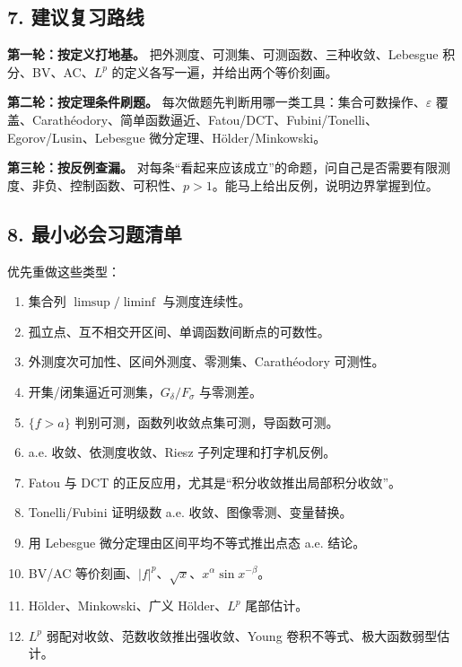\documentclass[
UTF8]{ctexart}
\providecommand{\tightlist}{%
\setlength{\itemsep}{0pt}\setlength{\parskip}{0pt}}
\begin{document}
\subsection{7. 建议复习路线}\label{ux5efaux8baeux590dux4e60ux8defux7ebf}

\textbf{第一轮：按定义打地基。}
把外测度、可测集、可测函数、三种收敛、Lebesgue 积分、BV、AC、\(L^p\)
的定义各写一遍，并给出两个等价刻画。

\textbf{第二轮：按定理条件刷题。}
每次做题先判断用哪一类工具：集合可数操作、\(\varepsilon\)
覆盖、Carathéodory、简单函数逼近、Fatou/DCT、Fubini/Tonelli、Egorov/Lusin、Lebesgue
微分定理、Hölder/Minkowski。

\textbf{第三轮：按反例查漏。}
对每条``看起来应该成立''的命题，问自己是否需要有限测度、非负、控制函数、可积性、\(p>1\)。能马上给出反例，说明边界掌握到位。

\subsection{8.
最小必会习题清单}\label{ux6700ux5c0fux5fc5ux4f1aux4e60ux9898ux6e05ux5355}

优先重做这些类型：

\begin{enumerate}
    \def\labelenumi{\arabic{enumi}.}
    \tightlist
  \item
    集合列 \(\limsup/\liminf\) 与测度连续性。
  \item
    孤立点、互不相交开区间、单调函数间断点的可数性。
  \item
    外测度次可加性、区间外测度、零测集、Carathéodory 可测性。
  \item
    开集/闭集逼近可测集，\(G_\delta/F_\sigma\) 与零测差。
  \item
    \(\{f>a\}\) 判别可测，函数列收敛点集可测，导函数可测。
  \item
    a.e. 收敛、依测度收敛、Riesz 子列定理和打字机反例。
  \item
    Fatou 与 DCT 的正反应用，尤其是``积分收敛推出局部积分收敛''。
  \item
    Tonelli/Fubini 证明级数 a.e. 收敛、图像零测、变量替换。
  \item
    用 Lebesgue 微分定理由区间平均不等式推出点态 a.e. 结论。
  \item
    BV/AC 等价刻画、\(|f|^p\)、\(\sqrt{x}\)、\(x^\alpha\sin x^{-\beta}\)。
  \item
    Hölder、Minkowski、广义 Hölder、\(L^p\) 尾部估计。
  \item
    \(L^p\) 弱配对收敛、范数收敛推出强收敛、Young
    卷积不等式、极大函数弱型估计。
\end{enumerate}
\end{document}

